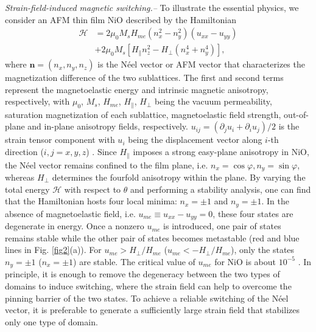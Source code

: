 \documentclass[aps,prl,reprint,floatfix,longbibliography,twocolumn]{revtex4-2}
\begin{document}
\textit{Strain-field-induced magnetic switching.--}
To illustrate the essential physics, we consider an AFM thin film NiO described by the Hamiltonian \cite{Meernl2021}
\begin{equation}\label{eqn1}
\begin{aligned}
\mathcal{H} &= 2\mu_0M_sH_{me}(n_x^2-n_y^2)(u_{xx}-u_{yy}) \\
&+ 2\mu_0M_s[H_{\parallel}n_z^2-H_{\perp}(n_x^4+n_y^4)],
\end{aligned}
\end{equation}
where $\mathbf{n}=(n_x, n_y,n_z)$ is the Néel vector or AFM vector that characterizes the magnetization difference of the two sublattices. The first and second terms represent the magnetoelastic energy and intrinsic magnetic anisotropy, respectively, with $\mu_0$, $M_s$, $H_{me}$, $H_{\parallel}$, $H_{\perp}$ being the vacuum permeability, saturation magnetization of each sublattice,
magnetoelastic field strength, out-of-plane and in-plane anisotropy fields, respectively. $u_{ij}=(\partial_j u_i + \partial_i u_j)/2$ is the strain tensor component with $u_i$ being the displacement vector along $i$-th direction ($i,j=x,y,z$) \cite{Landaubook,Hetnarski}. Since $H_\parallel$ imposes a strong easy-plane anisotropy in NiO, the Néel vector remains confined to the film plane, i.e. $n_x = \cos \varphi, n_y=\sin \varphi$, whereas $H_\perp$ determines the fourfold anisotropy within the plane. By varying the total energy $\mathcal{H}$ with respect to $\theta$ and performing a stability analysis, one can find that the Hamiltonian hosts four local minima: $n_x=\pm 1$ and $n_y=\pm 1$.
In the absence of magnetoelastic field, i.e. $u_{me}\equiv u_{xx}-u_{yy}=0$, these four states are degenerate in energy. Once a nonzero $u_{me}$ is introduced, one pair of states remains stable while the other pair of states becomes metastable (red and blue lines in Fig. \ref{fig2}(a)). For $u_{me}>H_{\perp}/H_{me}$ ($u_{me}<-H_{\perp}/H_{me}$), only the states $n_y =\pm 1$ ($n_x=\pm1$) are stable. The critical value of $u_{me}$ for NiO is about $10^{-5}$ \cite{Meernl2021}. In principle, it is enough to remove the degeneracy between the two types of domains to induce switching, where the strain field can help to overcome the pinning barrier of the two states. To achieve a reliable switching of the Néel vector, it is preferable to generate a sufficiently large strain field that stabilizes only one type of domain.
\end{document}

